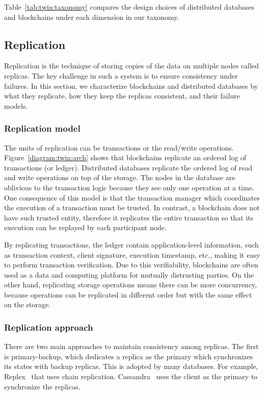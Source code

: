 Table~\ref{tab:twin:taxonomy} compares the design choices of distributed databases and blockchains under each dimension in our taxonomy. 

\subsection{Replication}
Replication is the technique of storing copies of the data on multiple nodes called replicas. The key
challenge in such a system is to ensure consistency under failures.
In this section, we characterize blockchains and distributed databases by what they replicate, how they keep
the replicas consistent, and their failure models.

\subsubsection{Replication model}
The units of replication can be transactions or the read/write operations.
Figure~\ref{diagram:twin:arch} shows that blockchains replicate an ordered log of transactions (or ledger).  
Distributed databases replicate the ordered log of read and write operations on top
of the storage. The nodes in the database are oblivious to the transaction logic because they see only one
operation at a time. One consequence of this model is that the transaction manager which coordinates the
execution of a transaction must be trusted. In contrast, a blockchain does not have such trusted entity,
therefore it replicates the entire transaction so that its execution can be replayed by each participant node.

By replicating transactions, the ledger contain application-level information, such as transaction context,
client signature, execution timestamp, etc.,  making it easy to perform transaction verification.  Due to this
verifiability, blockchains are often used as a data and computing platform for mutually distrusting parties.
On the other hand, replicating storage operations means there can be more concurrency, because
operations can be replicated in different order but with the same effect on the storage.  

\subsubsection{Replication approach}
There are two main approaches to maintain consistency among replicas. The first
is primary-backup, which dedicates a replica as the primary which synchronizes
its states with backup replicas. This is adopted by many databases.
For example, Replex~\cite{replex} that uses chain replication.
Cassandra~\cite{lakshman2010cassandra} uses the client as the primary to
synchronize the replicas.

